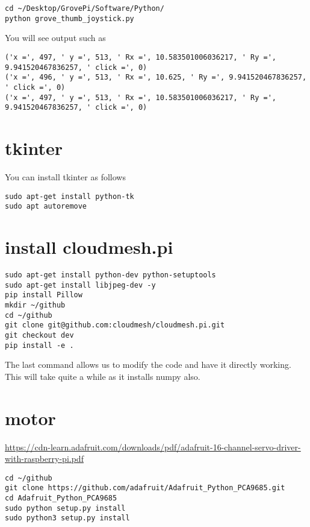 \begin{lstlisting}
cd ~/Desktop/GrovePi/Software/Python/   
python grove_thumb_joystick.py
\end{lstlisting}

You will see output such as

\begin{lstlisting}
('x =', 497, ' y =', 513, ' Rx =', 10.583501006036217, ' Ry =', 9.941520467836257, ' click =', 0)
('x =', 496, ' y =', 513, ' Rx =', 10.625, ' Ry =', 9.941520467836257, ' click =', 0)
('x =', 497, ' y =', 513, ' Rx =', 10.583501006036217, ' Ry =', 9.941520467836257, ' click =', 0)
\end{lstlisting}

\section{tkinter}

You can install tkinter as follows

\begin{lstlisting}
sudo apt-get install python-tk
sudo apt autoremove
\end{lstlisting}

\section{install cloudmesh.pi}

\begin{lstlisting}
sudo apt-get install python-dev python-setuptools
sudo apt-get install libjpeg-dev -y
pip install Pillow
mkdir ~/github
cd ~/github
git clone git@github.com:cloudmesh/cloudmesh.pi.git
git checkout dev
pip install -e .
\end{lstlisting}

The last command allows us to modify the code and have it directly
working. This will take quite a while as it installs numpy also.

\section{motor}

\url{https://cdn-learn.adafruit.com/downloads/pdf/adafruit-16-channel-servo-driver-with-raspberry-pi.pdf}

\begin{lstlisting}
cd ~/github
git clone https://github.com/adafruit/Adafruit_Python_PCA9685.git
cd Adafruit_Python_PCA9685
sudo python setup.py install
sudo python3 setup.py install
\end{lstlisting}

